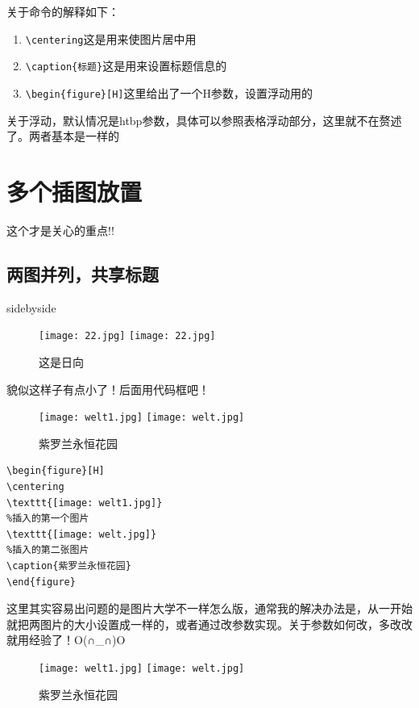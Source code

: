 \documentclass[cn,chinese,color=cyan]{elegantbook}
\begin{document}
关于命令的解释如下：

\begin{enumerate}
	\item \verb|\centering|这是用来使图片居中用
	\item \verb|\caption{标题}|这是用来设置标题信息的
	\item \verb|\begin{figure}[H]|这里给出了一个H参数，设置浮动用的
\end{enumerate}
\begin{note}
关于浮动，默认情况是htbp参数，具体可以参照表格浮动部分，这里就不在赘述了。两者基本是一样的
\end{note}

\section{多个插图放置}
这个才是关心的重点!!
\subsection{两图并列，共享标题}
\begin{tcblisting}{sidebyside}
\begin{figure}[H]
\centering
\texttt{[image: 22.jpg]}
\texttt{[image: 22.jpg]}
\caption{这是日向}
\end{figure}
\end{tcblisting}
貌似这样子有点小了！后面用代码框吧！
\begin{figure}[H]
	\centering
	\texttt{[image: welt1.jpg]}
	\texttt{[image: welt.jpg]}
	\caption{紫罗兰永恒花园}
\end{figure}

\begin{lstlisting}[style=R]
\begin{figure}[H]
\centering
\texttt{[image: welt1.jpg]}
%插入的第一个图片
\texttt{[image: welt.jpg]}
%插入的第二张图片
\caption{紫罗兰永恒花园}
\end{figure}
\end{lstlisting}
\begin{note}
这里其实容易出问题的是图片大学不一样怎么版，通常我的解决办法是，从一开始就把两图片的大小设置成一样的，或者通过改参数实现。关于参数如何改，多改改就用经验了！O(∩\_∩)O
\end{note}
\begin{figure}[H]
	\centering
	\texttt{[image: welt1.jpg]}
	\texttt{[image: welt.jpg]}
	\caption{紫罗兰永恒花园}
\end{figure}
\end{document}
